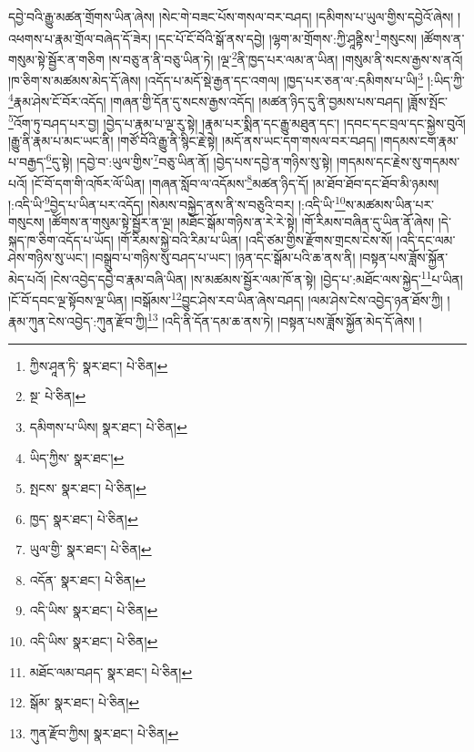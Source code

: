 དབྱེ་བའི་རྒྱུ་མཚན་གྲོགས་ཡིན་ཞེས། །སེང་གེ་བཟང་པོས་གསལ་བར་བཤད། །དམིགས་པ་ཡུལ་གྱིས་དབྱེའོ་ཞེས། །འཕགས་པ་རྣམ་གྲོལ་བཞེད་དོ་ཟེར། །དང་པོ་ངོ་བོའི་སྒོ་ནས་དབྱེ། །ལྷག་མ་གྲོགས་:ཀྱི་ཤཱནྟིས་\footnote{ཀྱིས་ཤཱན་ཏི་  སྣར་ཐང་།  པེ་ཅིན། }གསུངས། །ཚོགས་ན་གསུམ་སྟེ་སྦྱོར་ན་གཅིག །ས་བཅུ་ན་ནི་བཅུ་ཡིན་ཏེ། །ལྔ་\footnote{སྔ་  པེ་ཅིན། }ནི་ཁྱད་པར་ལམ་ན་ཡིན། །གསུམ་ནི་སངས་རྒྱས་ས་ནའོ། །ཁ་ཅིག་ས་མཚམས་མེད་དོ་ཞེས། །འདོད་པ་མདོ་སྡེ་རྒྱན་དང་འགལ། །ཁྱད་པར་ཅན་ལ་:དམིགས་པ་ཡི།\footnote{དམིགས་པ་ཡིས།  སྣར་ཐང་།  པེ་ཅིན། } །:ཡིད་ཀྱི་\footnote{ཡིད་ཀྱིས་  སྣར་ཐང་། }རྣམ་ཤེས་ངོ་བོར་འདོད། །གཞན་གྱི་དོན་དུ་སངས་རྒྱས་འདོད། །མཚན་ཉིད་དུ་ནི་བྱམས་པས་བཤད། །ཟློས་སྤོང་\footnote{སྤངས་  སྣར་ཐང་།  པེ་ཅིན། }འོག་ཏུ་བཤད་པར་བྱ། །བྱེད་པ་རྣམ་པ་ལྔ་རུ་སྟེ། །རྣམ་པར་སྨིན་དང་རྒྱུ་མཐུན་དང་། །དབང་དང་བྲལ་དང་སྐྱེས་བུའོ། །རྒྱུ་ནི་རྣམ་པ་མང་ཡང་ནི། །གཙོ་བོའི་རྒྱུ་ནི་སྙིང་རྗེ་སྟེ། །མདོ་ནས་ཡང་དག་གསལ་བར་བཤད། །གདམས་ངག་རྣམ་པ་བརྒྱད་\footnote{ཁྱད་  སྣར་ཐང་།  པེ་ཅིན། }དུ་སྟེ། །དབྱེ་བ་:ཡུལ་གྱིས་\footnote{ཡུལ་གྱི་  སྣར་ཐང་།  པེ་ཅིན། }བཅུ་ཡིན་ནོ། །བྱེད་པས་དབྱེ་ན་གཉིས་སུ་སྟེ། །གདམས་དང་རྗེས་སུ་གདམས་པའོ། །ངོ་བོ་དག་གི་འཁོར་ལོ་ཡིན། །གཞན་སློབ་ལ་འདོམས་\footnote{འདོན་  སྣར་ཐང་།  པེ་ཅིན། }མཚན་ཉིད་དོ། །མ་ཐོབ་ཐོབ་དང་ཐོབ་མི་ཉམས། །:འདི་ཡི་\footnote{འདི་ཡིས་  སྣར་ཐང་།  པེ་ཅིན། }བྱེད་པ་ཡིན་པར་འདོད། །སེམས་བསྐྱེད་ནས་ནི་ས་བཅུའི་བར། །:འདི་ཡི་\footnote{འདི་ཡིས་  སྣར་ཐང་།  པེ་ཅིན། }ས་མཚམས་ཡིན་པར་གསུངས། །ཚོགས་ན་གསུམ་སྟེ་སྦྱོར་ན་ལྔ། །མཐོང་སྒོམ་གཉིས་ན་རེ་རེ་སྟེ། །གོ་རིམས་བཞིན་དུ་ཡིན་ནོ་ཞེས། །དེ་སྐད་ཁ་ཅིག་འདོད་པ་ཡོད། །གོ་རིམས་སྐྱེ་བའི་རིམ་པ་ཡིན། །འདི་ཙམ་གྱིས་རྫོགས་གྲངས་ངེས་སོ། །འདི་དང་ལམ་ཤེས་གཉིས་སུ་ཡང་། །བསྒྲུབ་པ་གཉིས་སུ་བཤད་པ་ཡང་། །ཉན་དང་སྒོམ་པའི་ཆ་ནས་ནི། །བསྟན་པས་ཟློས་སྐྱོན་མེད་པའོ། །ངེས་འབྱེད་དབྱེ་བ་རྣམ་བཞི་ཡིན། །ས་མཚམས་སྦྱོར་ལམ་ཁོ་ན་སྟེ། །བྱེད་པ་:མཐོང་ལས་སྐྱེད་\footnote{མཐོང་ལམ་བཤད་  སྣར་ཐང་།  པེ་ཅིན། }པ་ཡིན། །ངོ་བོ་དབང་ལྔ་སྟོབས་ལྔ་ཡིན། །བསྒོམས་\footnote{སྒོམ་  སྣར་ཐང་།  པེ་ཅིན། }བྱུང་ཤེས་རབ་ཡིན་ཞེས་བཤད། །ལམ་ཤེས་ངེས་འབྱེད་ཉན་ཐོས་ཀྱི། །རྣམ་ཀུན་ངེས་འབྱེད་:ཀུན་རྫོབ་ཀྱི།\footnote{ཀུན་རྫོབ་ཀྱིས།  སྣར་ཐང་།  པེ་ཅིན། } །འདི་ནི་དོན་དམ་ཆ་ནས་ཏེ། །བསྟན་པས་ཟློས་སྐྱོན་མེད་དོ་ཞེས། །
